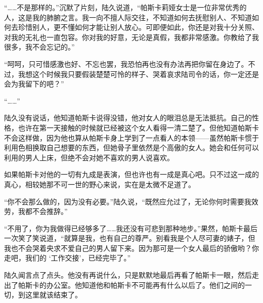  “……不是那样的。”沉默了片刻，陆久说道，“帕斯卡莉娅女士是一位非常优秀的人，这是我的肺腑之言。我一向不擅人际交往，不知道如何去抚慰别人、不知道如何去珍惜别人，更不懂如何才能让别人放心。可即便如此，你还是对我十分关照、对我的无礼也一直包容。你对我的好意，无论是真假，我都非常感激。你教给了我很多，我不会忘记的。”

“呵呵，只可惜感激也好、不忘也罢，我恐怕再也没有办法再把你留在身边了。不过，我想这个时候我只要假装楚楚可怜的样子、哭着哀求陆司令的话，你一定还是会为我留下的吧？”

“……”

陆久没有说话，他知道帕斯卡说得没错，他对女人的眼泪总是无法抵抗。自己的性格，也许在第一天接触的时候就已经被这个女人看得一清二楚了。但他知道帕斯卡不会这样做，因为他也算从帕斯卡身上学到了一点看人的本领——虽然帕斯卡惯于利用色相换取自己想要的东西，但她骨子里依然是个高傲的女人。她会和任何可以利用的男人上床，但绝不会对她不喜欢的男人说喜欢。

如果帕斯卡对他的一切有九成是表演，但也许也有一成是真心吧。只不过这一成的真心，相较她那不可一世的野心来说，实在是太微不足道了。

“你不会那么做的，因为没有必要。”陆久说，“既然应允过了，无论你何时需要我效劳，我都不会推辞。”

“不用了，你为我做得已经够多了……我还没有可悲到那种地步。”果然，帕斯卡最后一次笑了笑说道，“就算是我，也有自己的尊严。别看我是个人尽可妻的婊子，但我也不会哭着央求不爱自己的男人留下来。因为那可是一个女人最后的骄傲哟？你走吧，我们的 ‘工作交接’，已经完毕了。”

陆久闻言点了点头。他没有再说什么，只是默默地最后再看了帕斯卡一眼，然后走出了帕斯卡的办公室。他知道他和帕斯卡不可能再有什么以后了。他们之间的一切，到这里就该结束了。